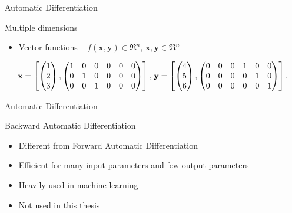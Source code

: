 \begin{frame}{Automatic Differentiation}
    \begin{block}{Multiple dimensions}
        \begin{itemize}
            \item Vector functions -- $f(\textbf{x},\textbf{y})\in\Re^n$, $\textbf{x},\textbf{y}\in\Re^n$
        \end{itemize}
        
        \begin{equation*}
            \textbf{x} = \left[\begin{pmatrix}1\\2\\3
            \end{pmatrix},\begin{pmatrix}
            1&0&0&0&0&0\\
            0&1&0&0&0&0\\
            0&0&1&0&0&0\end{pmatrix} \right],
            \hspace{0.1em}
            \textbf{y}=\left[\begin{pmatrix}4\\5\\6
            \end{pmatrix},\begin{pmatrix}
            0&0&0&1&0&0\\
            0&0&0&0&1&0\\
            0&0&0&0&0&1\end{pmatrix} \right].
        \end{equation*}
    \end{block}
\end{frame}
\begin{frame}{Automatic Differentiation}
    \begin{block}{Backward Automatic Differentiation}
        \centering
            \begin{itemize}
                \item Different from Forward Automatic Differentiation
                \item Efficient for many input parameters and few output parameters
                \item Heavily used in machine learning
                \item Not used in this thesis
            \end{itemize}
    \end{block}
\end{frame}
